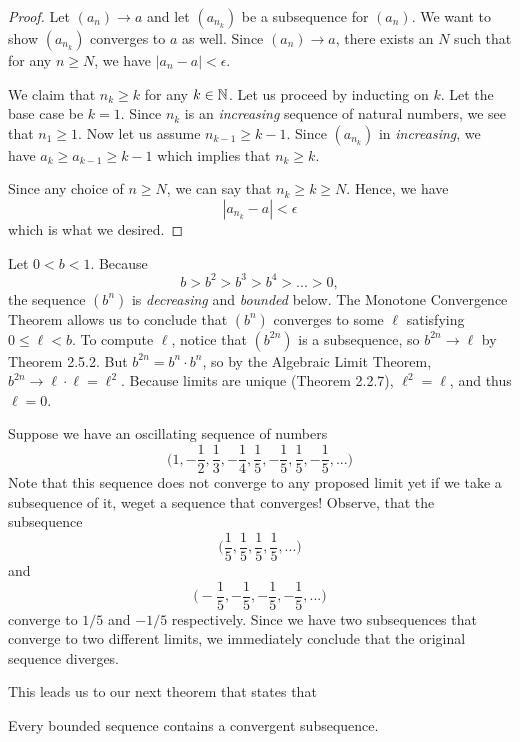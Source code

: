 \begin{proof}
    Let \( (a_n) \to a \) and let \( (a_{n_k})\) be a subsequence for \( (a_n)\). We want to show \( (a_{n_k})\) converges to \( a \) as well. Since \( (a_n) \to a\), there exists an \( N \) such that for any \( n \geq N \), we have \( |a_n - a| < \epsilon \). 

    We claim that \( n_{k} \geq k \) for any \( k \in \mathbb{N}\). Let us proceed by inducting on \( k \). Let the base case be \( k = 1 \). Since \(n_k\) is an \textit{increasing} sequence of natural numbers, we see that \( n_1 \geq 1\). Now let us assume \(n_{k-1} \geq k - 1\). Since \( (a_{n_k})\) in \textit{increasing}, we have \( a_k \geq a_{k-1} \geq k - 1\) which implies that \( n_k \geq k \). 

    Since any choice of \( n \geq N \), we can say that \( n_k \geq k \geq N \). Hence, we have 
    \[ |a_{n_k} - a| < \epsilon \]
which is what we desired.
\end{proof}

Let \(0 < b < 1\). Because 
\[ b > b^2 > b^3 > b^4 > ... > 0,\]
the sequence \((b^n)\) is \textit{decreasing} and \textit{bounded} below. The Monotone Convergence Theorem allows us to conclude that \((b^n)\) converges to some \(\ell\) satisfying \( 0 \leq \ell < b\). To compute \(\ell\), notice that \((b^{2n})\) is a subsequence, so \(b^{2n} \to \ell\) by Theorem 2.5.2. But \( b^{2n} = b^n \cdot b^n\), so by the Algebraic Limit Theorem, \(b^{2n} \to \ell \cdot \ell = \ell^2 \). Because limits are unique (Theorem 2.2.7), \( \ell^2 = \ell\), and thus \( \ell = 0\). 











Suppose we have an oscillating sequence of numbers 
\[ \Big( 1, -\frac{1}{2}, \frac{1}{3}, - \frac{1}{4}, \frac{1}{5}, -\frac{1}{5}, \frac{1}{5}, -\frac{1}{5},... \Big)\]
Note that this sequence does not converge to any proposed limit yet if we take a subsequence of it, weget a sequence that converges! Observe, that the subsequence 
\[ \Big(\frac{1}{5}, \frac{1}{5}, \frac{1}{5}, \frac{1}{5},... \Big)\]
and
\[ \Big(-\frac{1}{5}, -\frac{1}{5}, -\frac{1}{5}, -\frac{1}{5},... \Big)\]
converge to \( 1 / 5 \) and \(- 1 / 5\) respectively. Since we have two subsequences that converge to two different limits, we immediately conclude that the original sequence diverges.

This leads us to our next theorem that states that
\begin{theorem}
        Every bounded sequence contains a convergent subsequence.
\end{theorem}%

